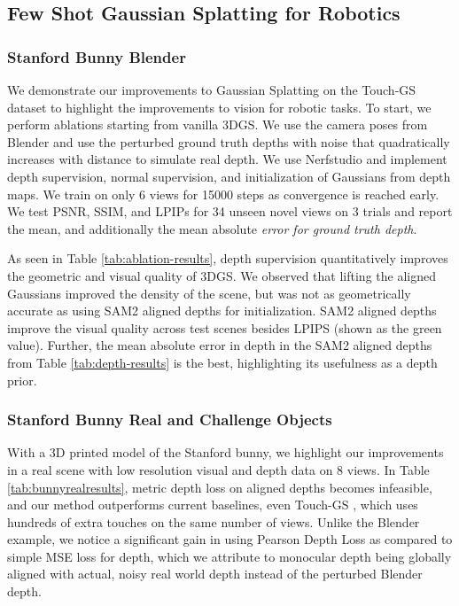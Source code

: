 \documentclass[letterpaper, 10 pt, conference]{ieeeconf}  %
\begin{document}
\subsection{Few Shot Gaussian Splatting for Robotics}


\subsubsection{Stanford Bunny Blender} We demonstrate our improvements to Gaussian Splatting on the Touch-GS \cite{swann2024touch} dataset to highlight the improvements to vision for robotic tasks.  To start, we perform ablations starting from vanilla \gls*{3DGS}. We use the camera poses from Blender and use the perturbed ground truth depths with noise that quadratically increases with distance to simulate real depth. We use Nerfstudio \cite{nerfstudio} and implement depth supervision, normal supervision, and initialization of Gaussians from depth maps. We train on only $6$ views for 15000 steps as convergence is reached early. We test PSNR, SSIM, and LPIPs for 34 unseen novel views on 3 trials and report the mean, and additionally the mean absolute \textit{error for ground truth depth}.  

As seen in Table \ref{tab:ablation-results}, depth supervision quantitatively improves the geometric and visual quality of \gls*{3DGS}. We observed that lifting the aligned Gaussians improved the density of the scene, but was not as geometrically accurate as using SAM2 aligned depths for initialization. SAM2 aligned depths improve the visual quality across test scenes besides LPIPS (shown as the green value). Further, the mean absolute error in depth in the SAM2 aligned depths from Table \ref{tab:depth-results} is the best, highlighting its usefulness as a depth prior.

\subsubsection{Stanford Bunny Real and Challenge Objects} With a 3D printed model of the Stanford bunny, we highlight our improvements in a real scene with low resolution visual and depth data on 8 views. In Table \ref{tab:bunnyrealresults}, metric depth loss on aligned depths becomes infeasible, and our method outperforms current baselines, even Touch-GS \cite{swann2024touch}, which uses hundreds of extra touches on the same number of views. Unlike the Blender example, we notice a significant gain in using Pearson Depth Loss as compared to simple MSE loss for depth, which we attribute to monocular depth being globally aligned with  actual, noisy real world depth instead of the perturbed Blender depth. 
\end{document}
